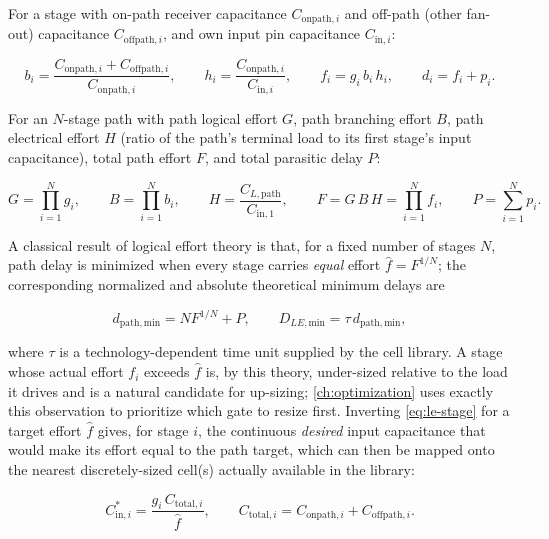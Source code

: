 For a stage with on-path receiver capacitance $C_{\mathrm{onpath},i}$ and
off-path (other fan-out) capacitance $C_{\mathrm{offpath},i}$, and own input
pin capacitance $C_{\mathrm{in},i}$:

\begin{equation}
    b_i = \frac{C_{\mathrm{onpath},i} + C_{\mathrm{offpath},i}}{C_{\mathrm{onpath},i}},
    \qquad
    h_i = \frac{C_{\mathrm{onpath},i}}{C_{\mathrm{in},i}},
    \qquad
    f_i = g_i\, b_i\, h_i,
    \qquad
    d_i = f_i + p_i.
    \label{eq:le-stage}
\end{equation}

For an $N$-stage path with path logical effort $G$, path branching effort
$B$, path electrical effort $H$ (ratio of the path's terminal load to its
first stage's input capacitance), total path effort $F$, and total
parasitic delay $P$:

\begin{equation}
    G = \prod_{i=1}^{N} g_i, \qquad
    B = \prod_{i=1}^{N} b_i, \qquad
    H = \frac{C_{L,\mathrm{path}}}{C_{\mathrm{in},1}}, \qquad
    F = G\,B\,H = \prod_{i=1}^{N} f_i, \qquad
    P = \sum_{i=1}^{N} p_i.
    \label{eq:le-path}
\end{equation}

A classical result of logical effort theory is that, for a fixed number of
stages $N$, path delay is minimized when every stage carries \emph{equal}
effort $\hat{f} = F^{1/N}$; the corresponding normalized and absolute
theoretical minimum delays are

\begin{equation}
    d_{\mathrm{path,min}} = N F^{1/N} + P,
    \qquad
    D_{LE,\mathrm{min}} = \tau\, d_{\mathrm{path,min}},
    \label{eq:le-min-delay}
\end{equation}

where $\tau$ is a technology-dependent time unit supplied by the cell
library. A stage whose actual effort $f_i$ exceeds $\hat{f}$ is, by this
theory, under-sized relative to the load it drives and is a natural
candidate for up-sizing; \cref{ch:optimization} uses exactly this
observation to prioritize which gate to resize first. Inverting
\cref{eq:le-stage} for a target effort $\hat f$ gives, for stage $i$, the
continuous \emph{desired} input capacitance that would make its effort
equal to the path target, which can then be mapped onto the nearest
discretely-sized cell(s) actually available in the library:

\begin{equation}
    C^{*}_{\mathrm{in},i} = \frac{g_i\, C_{\mathrm{total},i}}{\hat f},
    \qquad
    C_{\mathrm{total},i} = C_{\mathrm{onpath},i} + C_{\mathrm{offpath},i}.
    \label{eq:le-target-cap}
\end{equation}

